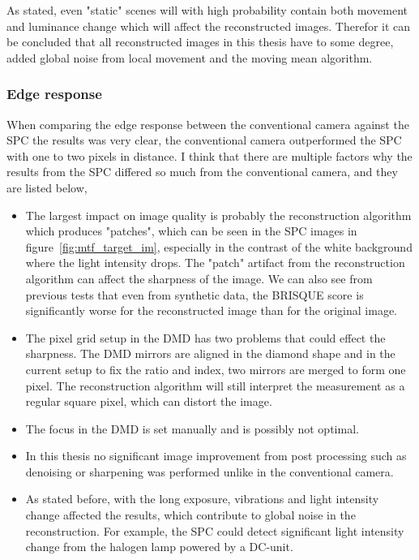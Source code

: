 As stated, even "static" scenes will with high probability contain both movement and luminance change which will affect the reconstructed images. Therefor it can be concluded that all reconstructed images in this thesis have to some degree, added global noise from local movement and the moving mean algorithm.


\subsubsection{Edge response}
When comparing the edge response between the conventional camera against the SPC the results was very clear, the conventional camera outperformed the SPC with one to two pixels in distance. I think that there are multiple factors why the results from the SPC differed so much from the conventional camera, and they are listed below,

\begin{itemize}
\item The largest impact on image quality is probably the reconstruction algorithm which produces "patches", which can be seen in the SPC images in figure~\ref{fig:mtf_target_im}, especially in the contrast of the white background where the light intensity drops. The "patch" artifact from the reconstruction algorithm can affect the sharpness of the image. We can also see from previous tests that even from synthetic data, the BRISQUE score is significantly worse for the reconstructed image than for the original image.

\item The pixel grid setup in the DMD has two problems that could effect the sharpness. The DMD mirrors are aligned in the diamond shape and in the current setup to fix the ratio and index, two mirrors are merged to form one pixel. The reconstruction algorithm will still interpret the measurement as a regular square pixel, which can distort the image.

\item The focus in the DMD is set manually and is possibly not optimal.

\item In this thesis no significant image improvement from post processing such as denoising or sharpening was performed unlike in the conventional camera.

\item As stated before, with the long exposure, vibrations and light intensity change affected the results, which contribute to global noise in the reconstruction. For example, the SPC could detect significant light intensity change from the halogen lamp powered by a DC-unit.

\end{itemize}

